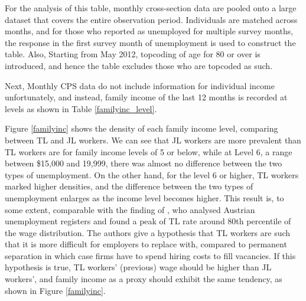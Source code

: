 \documentclass[a4paper, 11pt, tikz]{article}
\newenvironment{ltable}
  {\begin{landscape}}
  {\end{landscape}}
\begin{document}
For the analysis of this table, monthly cross-section data are pooled onto a large dataset that covers the entire observation period.
Individuals are matched across months, and for those who reported as unemployed for multiple survey months, the response in the first survey month of unemployment is used to construct the table.
Also, Starting from May 2012, topcoding of age for 80 or over is introduced, and hence the table excludes those who are topcoded as such.

\begin{ltable}
  
\end{ltable}

Next, Monthly CPS data do not include information for individual income unfortunately, and instead, family income of the last 12 months is recorded at levels as shown in Table \ref{familyinc_level}.



Figure \ref{familyinc} shows the density of each family income level, comparing between TL and JL workers.
We can see that JL workers are more prevalent than TL workers are for family income levels of 5 or below, while at Level 6, a range between \$15,000 and 19,999, there was almost no difference between the two types of unemployment.
On the other hand, for the level 6 or higher, TL workers marked higher densities, and the difference between the two types of unemployment enlarges as the income level becomes higher.
This result is, to some extent, comparable with the finding of \cite{nekoei2020seven}, who analysed Austrian unemployment registers and found a peak of TL rate around 80th percentile of the wage distribution.
The authors give a hypothesis that TL workers are such that it is more difficult for employers to replace with, compared to permanent separation in which case firms have to spend hiring costs to fill vacancies.
If this hypothesis is true, TL workers' (previous) wage should be higher than JL workers', and family income as a proxy should exhibit the same tendency, as shown in Figure \ref{familyinc}.
\end{document}
